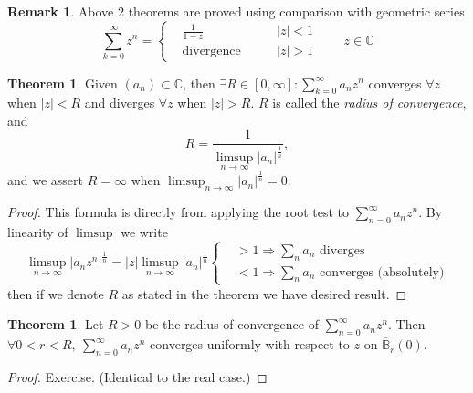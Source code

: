 \documentclass[a4paper]{article}
\theoremstyle{definition}
\newtheorem{thm}[defn]{Theorem}
\newtheorem*{remark}{Remark}
\begin{document}
\begin{remark}
Above 2 theorems are proved using comparison with geometric series
\[
\sum_{k=0}^\infty z^n = \left\{\begin{aligned}
&\frac{1}{1-z} \qquad &|z|<1 \\ &\text{divergence} \qquad &|z|>1
\end{aligned} \right. \qquad z\in \mathbb C
\]
\end{remark}

\begin{thm}
Given $(a_n) \subset \mathbb C$, then $\displaystyle \exists R\in [0,\infty]:\sum_{k=0}^\infty a_n z^n$ converges $\forall z$ when $|z|<R$ and diverges $\forall z$ when $|z|>R$. $R$ is called the \textit{radius of convergence}, and
\[
R=\frac{1}{\displaystyle \limsup_{n\rightarrow \infty} |a_n|^{\frac1n}},
\]
and we assert $R=\infty$ when $\displaystyle \limsup_{n\rightarrow \infty} |a_n|^{\frac1n}=0.$
\end{thm}
\begin{proof}
This formula is directly from applying the root test to $\sum_{n=0}^\infty a_n z^n$. By linearity of $\limsup$ we write
\[
\limsup_{n\rightarrow \infty} \left|a_n z^n\right|^{\frac1n} = |z| \limsup_{n\rightarrow \infty} |a_n|^{\frac1n}\left\{\begin{aligned}
&>1 \Rightarrow \sum_n a_n \text{ diverges} \\
&<1\Rightarrow \sum_n a_n \text{ converges (absolutely)}
\end{aligned} \right.
\]
then if we denote $R$ as stated in the theorem we have desired result.
\end{proof}

\begin{thm}
Let $R>0$ be the radius of convergence of $\displaystyle \sum_{n=0}^\infty a_n z^n$. Then $\displaystyle \forall 0<r<R,\ \sum_{n=0}^\infty a_n z^n$ converges uniformly with respect to $z$ on $\overline{\mathbb B}_r(0).$
\end{thm}
\begin{proof}
Exercise. (Identical to the real case.)
\end{proof}
\end{document}
